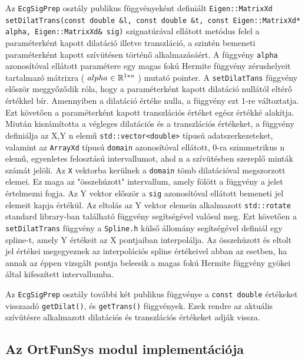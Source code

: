 \documentclass[oneside,titlepage,12pt,a4paper]{report}
\begin{document}
\par  Az \texttt{EcgSigPrep} osztály publikus függvényeként definiált \texttt{Eigen::MatrixXd} \linebreak \texttt{setDilatTrans(const double \&l, const double \&t, const Eigen::MatrixXd*} \linebreak \texttt{alpha, Eigen::MatrixXd\& sig)} szignatúrával ellátott metódus felel a paraméterként kapott dilatáció illetve transzláció, a szintén bemeneti paraméterként kapott szívütésen történő alkalmazásáért. A függvény \texttt{alpha} azonosítóval ellátott paramétere egy magas fokú Hermite függvény zérushelyeit tartalmazó mátrixra ( $ alpha \in \Bbb R^{1*n} $ ) mutató pointer. A \texttt{setDilatTans} függvény először meggyőződik róla, hogy a paraméterként kapott dilatáció nullától eltérő értékkel bír. Amennyiben a dilatáció értéke nulla, a függvény ezt 1-re változtatja. Ezt követően a paraméterként kapott transzlációs értéket egész értékké alakítja. Miután kiszámította a végleges dilatációs és a transzlációs értékeket, a függvény definiálja az X,Y n elemű \texttt{std::vector<double>} típusú adatszerkezeteket, valamint az \texttt{ArrayXd} típusú \texttt{domain} azonosítóval ellátott, 0-ra szimmetrikus n elemű, egyenletes felosztású intervallumot, ahol n a szívütésben szereplő minták számát jelöli. Az \texttt{X} vektorba kerülnek a \texttt{domain} tömb dilatációval megszorzott elemei. Ez maga az "összehúzott" intervallum, amely fölött a függvény a jelet értelmezni fogja. Az Y vektor először a \texttt{sig} azonosítóval ellátott bemeneti jel elemeit kapja értékül. Az eltolás az Y vektor elemein alkalmazott \texttt{std::rotate} standard library-ban található függvény segítségével valósul meg. Ezt követően a \texttt{setDilatTrans} függvény a \texttt{Spline.h} külső állomány segítségével definiál egy spline-t, amely Y értékeit az X pontjaiban interpolálja. Az összehúzott és eltolt jel értékei megegyeznek az interpolációs spline értékeivel abban az esetben, ha annak az éppen vizsgált pontja beleesik a magas fokú Hermite függvény gyökei által kifeszített intervallumba. 
\par Az \texttt{EcgSigPrep} osztály további két publikus függvénye a \texttt{const double} értékeket visszaadó \texttt{getDilat()}, és \texttt{getTrans()} függvények. Ezek rendre az aktuális szívütésre alkalmazott dilatációs és transzlációs értékeket adják vissza.     

\subsection{Az OrtFunSys modul implementációja}
\end{document}
